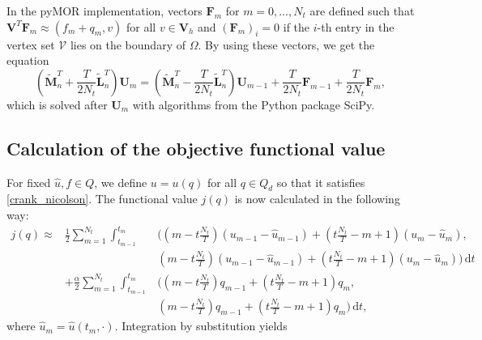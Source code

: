 In the pyMOR implementation, vectors $\mathbf{F}_m$ for $m=0,\dotsc,N_t$ are defined such that $\mathbf{V}^T\mathbf{F}_m\approx(f_m + q_m, v)$ for all $v\in \mathbf{V}_h$ and $\left(\mathbf{F}_m\right)_i=0$ if the $i$-th entry in the vertex set $\mathcal{V}$ lies on the boundary of $\Omega$. By using these vectors, we get the equation
\begin{equation}
\label{crank_nicolson}
\left(\tilde{\mathbf{M}}_n^T + \frac{T}{2N_t} \tilde{\mathbf{L}}_n^T\right) \mathbf{U}_m = \left(\tilde{\mathbf{M}}_n^T - \frac{T}{2N_t} \tilde{\mathbf{L}}_n^T\right) \mathbf{U}_{m-1} + \frac{T}{2N_t} \mathbf{F}_{m-1} + \frac{T}{2N_t} \mathbf{F}_m,
\end{equation}
which is solved after $\mathbf{U}_m$ with algorithms from the Python package SciPy.

\subsection{\label{subsectionCalculationOfTheObjectiveFunctionValue}Calculation of the objective functional value}
For fixed $\hat{u},f\in Q$, we define $u=u(q)$ for all $q\in Q_d$ so that it satisfies \eqref{crank_nicolson}. The functional value $j(q)$ is now calculated in the following way:
\begin{eqnarray*}
j(q) \approx& \frac{1}{2}\sum_{m=1}^{N_t}\int_{t_{m-1}}^{t_m}&\bigg(\left(m-t\frac{N_t}{T}\right) \left(u_{m-1}-\hat{u}_{m-1}\right)+\left(t\frac{N_t}{T}-m+1\right) \left(u_{m}-\hat{u}_{m}\right),\\
&&\left(m-t\frac{N_t}{T}\right) \left(u_{m-1}-\hat{u}_{m-1}\right)+\left(t\frac{N_t}{T}-m+1\right) \left(u_{m}-\hat{u}_{m}\right)\bigg)\,\mathrm{d}t\\
&+ \frac{\alpha}{2}\sum_{m=1}^{N_t}\int_{t_{m-1}}^{t_m}&\bigg(\left(m-t\frac{N_t}{T}\right) q_{m-1}+\left(t\frac{N_t}{T}-m+1\right) q_{m},\\
&&\left(m-t\frac{N_t}{T}\right) q_{m-1}+\left(t\frac{N_t}{T}-m+1\right) q_{m}\bigg)\,\mathrm{d}t,
\end{eqnarray*}
where $\hat{u}_m=\hat{u}(t_m, \cdot)$. Integration by substitution yields
